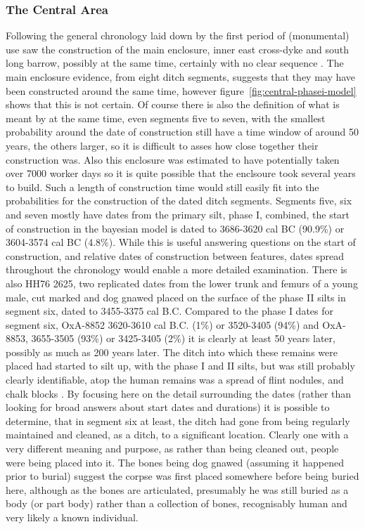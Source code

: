 \subsubsection{The Central Area}
Following the general chronology laid down by \citet[136]{Whittle:2011kl} the first period of (monumental) use saw the construction of the main enclosure, inner east cross-dyke and south long barrow, possibly at the same time, certainly with no clear sequence \citep[136]{Whittle:2011kl}. The main enclosure evidence, from eight ditch segments, suggests that they may have been constructed around the same time, however figure~\ref{fig:central-phasei-model} shows that this is not certain. Of course there is also the definition of what is meant by at the same time, even segments five to seven, with the smallest probability around the date of construction still have a time window of around 50 years, the others larger, so it is difficult to asses how close together their construction was. Also this enclosure was estimated to have potentially taken over 7000 worker days \citep[752]{Mercer:2008fk} so it is quite possible that the enclsoure took several years to build.  Such a length of construction time would still easily fit into the probabilities for the construction of the dated ditch segments. Segments five, six and seven mostly have dates from the primary silt, phase I, combined, the start of construction in the bayesian model is dated to 3686-3620 cal BC (90.9\%) or 3604-3574 cal BC (4.8\%). While this is useful answering questions on the start of construction, and relative dates of construction between features, dates spread throughout the chronology would enable a more detailed examination. There is also HH76 2625, two replicated dates from the lower trunk and femurs of a young male, cut marked and dog gnawed \citep[119]{Whittle:2011kl} placed on the surface of the phase II silts in segment six, dated to 3455-3375 cal B.C. Compared to the phase I dates for segment six, OxA-8852 3620-3610 cal B.C. (1\%) or 3520-3405 (94\%) and OxA-8853, 3655-3505 (93\%) or 3425-3405 (2\%) it is clearly at least 50 years later, possibly as much as 200 years later. The ditch into which these remains were placed had started to silt up, with the phase I and II silts, but was still probably clearly identifiable, atop the human remains was a spread of flint nodules, and chalk blocks \citep[72]{Mercer:2008fk}. By focusing here on the detail surrounding the dates (rather than looking for broad answers about start dates and durations) it is possible to determine, that in segment six at least, the ditch had gone from being regularly maintained and cleaned, as a ditch, to a significant location. Clearly one with a very different meaning and purpose, as rather than being cleaned out, people were being placed into it. The bones being dog gnawed (assuming it happened prior to burial) suggest the corpse was first placed somewhere before being buried here, although as the bones are articulated, presumably he was still buried as a body (or part body) rather than a collection of bones, recognisably human and very likely a known individual.


